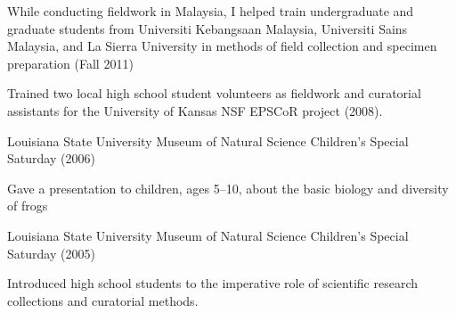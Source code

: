 \begin{myItemize}
\item While conducting fieldwork in Malaysia, I helped train undergraduate and
    graduate students from Universiti Kebangsaan Malaysia, Universiti Sains
    Malaysia, and La Sierra University in methods of field collection and
    specimen preparation (Fall 2011)
\item Trained two local high school student volunteers as fieldwork and
    curatorial assistants for the University of Kansas NSF EPSCoR project
    (2008).
\item Louisiana State University Museum of Natural Science Children's Special
    Saturday (2006)
    \begin{myItemize}
        \item Gave a presentation to children, ages 5--10, about the basic
            biology and diversity of frogs
    \end{myItemize}
\item Louisiana State University Museum of Natural Science Children's Special
    Saturday (2005)
    \begin{myItemize}
        \item Introduced high school students to the imperative role of
            scientific research collections and curatorial methods.
    \end{myItemize}
\end{myItemize}

